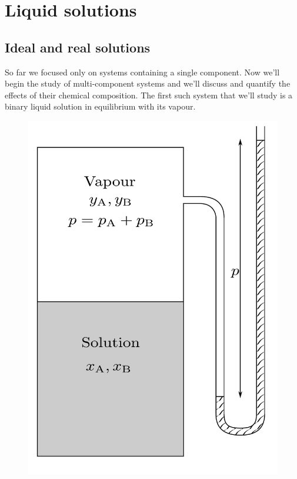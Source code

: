 \documentclass[12pt,a4paper]{report}
\begin{document}
   \pagestyle{headings}
   \thispagestyle{plain}
   \newpage
   \noindent
   \begin{center}
   \end{center}
   \section*{Liquid solutions}
   \subsection*{Ideal and real solutions}
   So far we focused only on systems containing a single component. Now we'll begin the study of multi-component systems and we'll discuss and quantify the effects of their chemical composition. 
   The first such system that we'll study is a binary liquid solution in equilibrium with its vapour. 
   \begin{figure}[H]
   \begin{center}
   \includegraphics[scale=0.3]{Images/Lect2_binary_solution.pdf} 
   \end{center}
   \end{figure}
\end{document}
